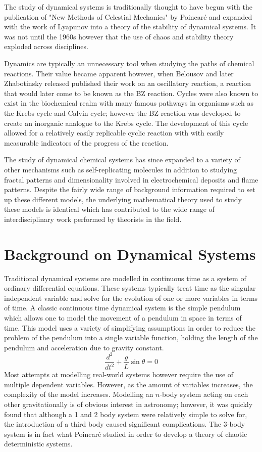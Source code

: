 The study of dynamical systems is traditionally thought to have begun with the publication of "New Methods of Celestial Mechanics" by Poincar\'e and expanded with the work of Lyapunov into a theory of the stability of dynamical systems. It was not until the 1960s however that the use of chaos and stability theory exploded across disciplines\autocite{Aubin2002}. 

Dynamics are typically an unnecessary tool when studying the paths of chemical reactions. Their value became apparent however, when Belousov and later Zhabotinsky released published their work on an oscillatory reaction, a reaction that would later come to be known as the BZ reaction\autocite{Winfree1984}. Cycles were also known to exist in the biochemical realm with many famous pathways in organisms such as the Krebs cycle and Calvin cycle; however the BZ reaction was developed to create an inorganic analogue to the Krebs cycle\autocite{Field1986}. The development of this cycle allowed for a relatively easily replicable cyclic reaction with with easily measurable indicators of the progress of the reaction. 

The study of dynamical chemical systems has since expanded to a variety of other mechanisms such as self-replicating molecules\autocite{Beutel2007} in addition to studying fractal patterns and dimensionality involved in electrochemical deposits\autocite{Hudson1994} and flame patterns\autocite{Matalon2009}. Despite the fairly wide range of background information required to set up these different models, the underlying mathematical theory used to study these models is identical which has contributed to the wide range of interdisciplinary work performed by theorists in the field.
\section{Background on Dynamical Systems}
Traditional dynamical systems are modelled in continuous time as a system of ordinary differential equations. These systems typically treat time as the singular independent variable and solve for the evolution of one or more variables in terms of time. A classic continuous time dynamical system is the simple pendulum which allows one to model the movement of a pendulum in space in terms of time. This model uses a variety of simplifying assumptions in order to reduce the problem of the pendulum into a single variable function, holding the length of the pendulum and acceleration due to gravity constant.
\begin{equation}
    \frac{d^2}{dt^2}+\frac{g}{L}\sin\theta=0
\end{equation}
Most  attempts  at  modelling  real-world  systems  however  require  the  use  of  multiple dependent variables.  However, as the amount of variables increases, the complexity of the model increases.  Modelling an $n$-body system acting on each other gravitationally is of obvious interest in astronomy; however, it was quickly found  that  although  a  1  and  2  body  system  were  relatively  simple  to  solve  for,  the introduction of a third body caused significant complications.  The 3-body system is in fact what Poincar\'e studied in order to develop a theory of chaotic deterministic systems\autocite{Poincare1993}.

